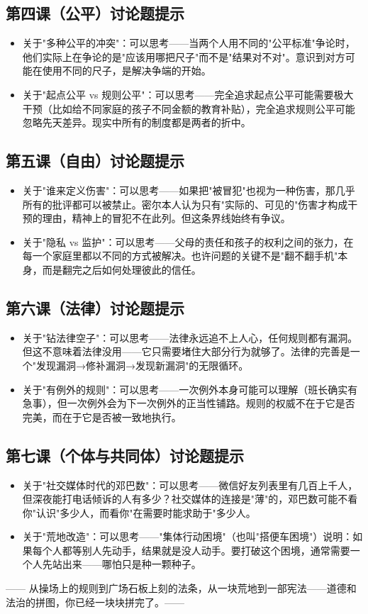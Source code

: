 \documentclass[a4paper,12pt]{ctexart}
\begin{document}
\subsection*{第四课（公平）讨论题提示}
\begin{itemize}
  \item 关于"多种公平的冲突"：可以思考——当两个人用不同的"公平标准"争论时，他们实际上在争论的是"应该用哪把尺子"而不是"结果对不对"。意识到对方可能在使用不同的尺子，是解决争端的开始。
  \item 关于"起点公平 vs 规则公平"：可以思考——完全追求起点公平可能需要极大干预（比如给不同家庭的孩子不同金额的教育补贴），完全追求规则公平可能忽略先天差异。现实中所有的制度都是两者的折中。
\end{itemize}

\subsection*{第五课（自由）讨论题提示}
\begin{itemize}
  \item 关于"谁来定义伤害"：可以思考——如果把"被冒犯"也视为一种伤害，那几乎所有的批评都可以被禁止。密尔本人认为只有"实际的、可见的"伤害才构成干预的理由，精神上的冒犯不在此列。但这条界线始终有争议。
  \item 关于"隐私 vs 监护"：可以思考——父母的责任和孩子的权利之间的张力，在每一个家庭里都以不同的方式被解决。也许问题的关键不是"翻不翻手机"本身，而是翻完之后如何处理彼此的信任。
\end{itemize}

\subsection*{第六课（法律）讨论题提示}
\begin{itemize}
  \item 关于"钻法律空子"：可以思考——法律永远追不上人心，任何规则都有漏洞。但这不意味着法律没用——它只需要堵住大部分行为就够了。法律的完善是一个"发现漏洞→修补漏洞→发现新漏洞"的无限循环。
  \item 关于"有例外的规则"：可以思考——一次例外本身可能可以理解（班长确实有急事），但一次例外会为下一次例外的正当性铺路。规则的权威不在于它是否完美，而在于它是否被一致地执行。
\end{itemize}

\subsection*{第七课（个体与共同体）讨论题提示}
\begin{itemize}
  \item 关于"社交媒体时代的邓巴数"：可以思考——微信好友列表里有几百上千人，但深夜能打电话倾诉的人有多少？社交媒体的连接是"薄"的，邓巴数可能不看你"认识"多少人，而看你"在需要时能求助于"多少人。
  \item 关于"荒地改造"：可以思考——"集体行动困境"（也叫"搭便车困境"）说明：如果每个人都等别人先动手，结果就是没人动手。要打破这个困境，通常需要一个人先站出来——哪怕只是种一颗种子。
\end{itemize}

\vspace{0.5cm}
\begin{center}
\textcolor{blue!70!black}{\large —— 从操场上的规则到广场石板上刻的法条，从一块荒地到一部宪法——道德和法治的拼图，你已经一块块拼完了。——}
\end{center}
\end{document}
